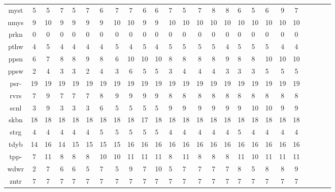 \begin{center}
\begin{tabular}{|c|cccHHH|cccHHH|cccHHH|cccHHH|}
myst & 5 & 5 & 7 & 5 & 7 & 6 & 7 & 7 & 6 & 6 & 7 & 5 & 7 & 8 & 8 & 6 & 5 & 6 & 9 & 7\\
nmys & 9 & 10 & 9 & 9 & 9 & 9 & 10 & 10 & 9 & 9 & 10 & 10 & 10 & 10 & 10 & 10 & 10 & 10 & 10 & 10\\
prkn & 0 & 0 & 0 & 0 & 0 & 0 & 0 & 0 & 0 & 0 & 0 & 0 & 0 & 0 & 0 & 0 & 0 & 0 & 0 & 0\\
pthw & 4 & 5 & 4 & 4 & 4 & 4 & 5 & 4 & 5 & 4 & 5 & 5 & 5 & 5 & 4 & 5 & 5 & 5 & 4 & 4\\
ppsn & 6 & 7 & 8 & 8 & 9 & 8 & 6 & 10 & 10 & 10 & 8 & 8 & 8 & 8 & 9 & 8 & 8 & 10 & 10 & 10\\
ppsw & 2 & 4 & 3 & 3 & 2 & 4 & 3 & 6 & 5 & 5 & 3 & 4 & 4 & 4 & 3 & 3 & 3 & 5 & 5 & 5\\
psr- & 19 & 19 & 19 & 19 & 19 & 19 & 19 & 19 & 19 & 19 & 19 & 19 & 19 & 19 & 19 & 19 & 19 & 19 & 19 & 19\\
rvrs & 7 & 9 & 7 & 7 & 7 & 8 & 9 & 9 & 9 & 9 & 8 & 8 & 8 & 8 & 8 & 8 & 8 & 8 & 8 & 8\\
scnl & 3 & 9 & 3 & 3 & 3 & 6 & 5 & 5 & 5 & 5 & 9 & 9 & 9 & 9 & 9 & 9 & 10 & 10 & 9 & 9\\
skbn & 18 & 18 & 18 & 18 & 18 & 18 & 18 & 18 & 17 & 18 & 18 & 18 & 18 & 18 & 18 & 18 & 18 & 18 & 18 & 18\\
strg & 4 & 4 & 4 & 4 & 4 & 5 & 5 & 5 & 5 & 5 & 4 & 4 & 4 & 4 & 4 & 5 & 4 & 4 & 4 & 4\\
tdyb & 14 & 16 & 14 & 15 & 15 & 15 & 15 & 16 & 16 & 16 & 16 & 16 & 16 & 16 & 16 & 16 & 16 & 16 & 16 & 16\\
tpp- & 7 & 11 & 8 & 8 & 8 & 10 & 10 & 11 & 11 & 11 & 8 & 11 & 8 & 8 & 8 & 11 & 10 & 11 & 11 & 11\\
wdwr & 2 & 7 & 6 & 6 & 5 & 7 & 5 & 9 & 7 & 10 & 5 & 7 & 7 & 7 & 7 & 8 & 5 & 8 & 8 & 9\\
zntr & 7 & 7 & 7 & 7 & 7 & 7 & 7 & 7 & 7 & 7 & 7 & 7 & 7 & 7 & 7 & 7 & 7 & 7 & 7 & 7\\
\end{tabular}
\end{center}
